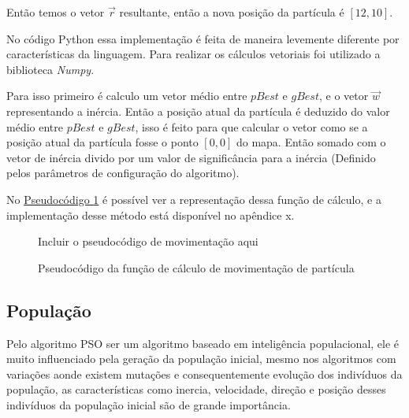                 \noindent Então temos o vetor $\vec r$ resultante, então a nova posição da partícula é $[12,10]$.
                
                No código Python essa implementação é feita de maneira levemente diferente por características da linguagem. Para realizar os cálculos vetoriais foi utilizado a biblioteca \textit{Numpy}. \newline
                
                Para isso primeiro é calculo um vetor médio entre $pBest$ e $gBest$, e o vetor $\vec w$ representando a inércia. \newline
                Então a posição atual da partícula é deduzido do valor médio entre $pBest$ e $gBest$, isso é feito para que calcular o vetor como se a posição atual da partícula fosse o ponto $[0,0]$ do mapa.\newline
                Então somado com o vetor de inércia divido por um valor de significância para a inércia (Definido pelos parâmetros de configuração do algoritmo).\newline

                No \hyperref[cod:new-posicao]{Pseudocódigo \ref{cod:new-posicao}} é possível ver a representação dessa função de cálculo, e a implementação desse método está disponível no apêndice x.
                
                \begin{figure}[h]
                    \centering
                    \small{Incluir o pseudocódigo de movimentação aqui}
                    \caption{Pseudocódigo da função de cálculo de movimentação de partícula}
                    \label{cod:new-posicao}
                \end{figure}






    \subsection{População}
        Pelo algoritmo PSO ser um algoritmo baseado em inteligência populacional, ele é muito influenciado pela geração da população inicial, mesmo nos algoritmos com variações aonde existem mutações e consequentemente evolução dos indivíduos da população, as características como inercia, velocidade, direção e posição desses indivíduos da população inicial são de grande importância.\newline


